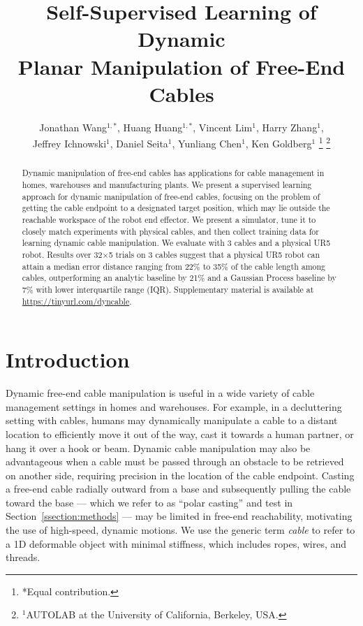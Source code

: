 \documentclass[letterpaper, 10 pt, conference]{ieeeconf}  %
\title{\LARGE \bf
Self-Supervised Learning of Dynamic \\ Planar Manipulation of Free-End Cables
}
\author{Jonathan Wang$^{1,*}$, Huang Huang$^{1,*}$, Vincent Lim$^{1}$, Harry Zhang$^{1}$,\\ Jeffrey Ichnowski$^1$, Daniel Seita$^1$, Yunliang Chen$^1$, Ken Goldberg$^1$%
\thanks{*Equal contribution.}%
\thanks{$^{1}$AUTOLAB at the University of California, Berkeley, USA.}%
}
\begin{document}
\maketitle
\thispagestyle{empty}
\pagestyle{empty}


\begin{abstract}
Dynamic manipulation of free-end cables has applications for cable management in homes, warehouses and manufacturing plants.
We present a supervised learning approach for dynamic manipulation of free-end cables, focusing on the problem of getting the cable endpoint to a designated target position, which may lie outside the reachable workspace of the robot end effector.
We present a simulator, tune it to closely match experiments with physical cables, and then collect training data for learning dynamic cable manipulation. We evaluate with 3 cables and a physical UR5 robot. Results over 32$\times$5 trials on 3 cables suggest that a physical UR5 robot can attain a median error distance ranging from 22$\%$ to 35$\%$ of the cable length among cables, outperforming an analytic baseline by 21$\%$ and a Gaussian Process baseline by 7$\%$ with lower interquartile range (IQR).
Supplementary material is available at \url{https://tinyurl.com/dyncable}.
\end{abstract}

\section{Introduction}\label{sec:intro}

Dynamic free-end cable manipulation is useful in a wide variety of cable management settings in homes and warehouses. For example, in a decluttering setting with cables, humans may dynamically manipulate a cable to a distant location to efficiently move it out of the way, cast it towards a human partner, or hang it over a hook or beam. Dynamic cable manipulation may also be advantageous when a cable must be passed through an obstacle to be retrieved on another side, requiring precision in the location of the cable endpoint. Casting a free-end cable radially outward from a base and subsequently pulling the cable toward the base --- which we refer to as ``polar casting'' and test in Section~\ref{ssection:methods} --- may be limited in free-end reachability, motivating the use of high-speed, dynamic motions. We use the generic term \emph{cable} to refer to a 1D deformable object with minimal stiffness, which includes ropes, wires, and threads. 
\end{document}
